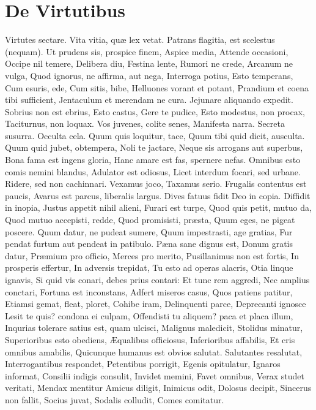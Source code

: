 \documentclass[12pt, twocolumn]{memoir}
\begin{document}
\chapter{De Virtutibus}

Virtutes sectare.
Vita vitia, quæ lex vetat.
Patrans flagitia, est scelestus (nequam).
Ut prudens sis, prospice finem,
Aspice media,
Attende occasioni,
Occipe nil temere,
Delibera diu,
Festina lente,
Rumori ne crede,
Arcanum ne vulga,
Quod ignorus, ne affirma, aut nega,
Interroga potius,
Esto temperans,
Cum esuris, ede,
Cum sitis, bibe,
Helluones vorant et potant,
Prandium et coena tibi sufficient,
Jentaculum et merendam ne cura.
Jejunare aliquando expedit.
Sobrius non est ebrius,
Esto castus,
Gere te pudice,
Esto modestus, non procax,
Taciturnus, non loquax.
Vos juvenes, colite senes,
Manifesta narra.
Secreta susurra.
Occulta cela.
Quum quis loquitur, tace,
Quum tibi quid dicit, ausculta.
Quum quid jubet, obtempera,
Noli te jactare,
Neque sis arrogans aut superbus,
Bona fama est ingens gloria,
Hanc amare est fas,
spernere nefas.
Omnibus esto comis nemini blandus,
Adulator est odiosus,
Licet interdum focari, sed urbane.
Ridere, sed non cachinnari.
Vexamus joco,
Taxamus serio.
Frugalis contentus est paucis,
Avarus est parcus, liberalis largus.
Dives fatuus fidit Deo in copia.
Diffidit in inopia,
Justus appetit nihil alieni,
Furari est turpe,
Quod quis petit, mutuo da,
Quod mutuo accepisti, redde,
Quod promisisti, præsta,
Quum eges, ne pigeat poscere.
Quum datur, ne pudeat sumere,
Quum impestrasti, age gratias,
Fur pendat furtum aut pendeat in patibulo.
Pæna sane dignus est,
Donum gratis datur,
Præmium pro officio,
Merces pro merito,
Pusillanimus non est fortis,
In prosperis effertur,
In adversis trepidat,
Tu esto ad operas alacris,
Otia linque ignavis,
Si quid vis conari, debes prius contari:
Et tunc rem aggredi,
Nec amplius conctari,
Fortuna est inconstans,
Adfert miseros casus,
Quos patiens patitur,
Etiamsi gemat, fleat, ploret,
Cohibe iram,
Delinquenti parce,
Deprecanti ignosce
Lesit te quis? condona ei culpam,
Offendisti tu aliquem? paca et placa illum,
Inqurias tolerare satius est, quam ulcisci,
Malignus maledicit,
Stolidus minatur,
Superioribus esto obediens,
Æqualibus officiosus,
Inferioribus affabilis,
Et cris omnibus amabilis,
Quicunque humanus est obvios salutat.
Salutantes resalutat,
Interrogantibus respondet,
Petentibus porrigit,
Egenis opitulatur,
Ignaros informat,
Consilii indigis consulit,
Invidet memini,
Favet omnibus,
Verax studet veritati,
Mendax mentitur
Amicus diligit,
Inimicus odit,
Dolosus decipit,
Sincerus non fallit,
Socius juvat,
Sodalis colludit,
Comes comitatur.
\end{document}
